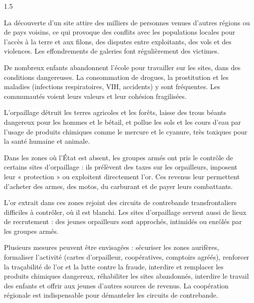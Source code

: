 \documentclass[12pt]{article}
\begin{document}
\begin{spacing}{1.5}


La découverte d'un site attire des milliers de personnes venues d'autres régions ou de pays voisins, ce qui provoque des conflits avec les populations locales pour l'accès à la terre et aux filons, des disputes entre exploitants, des vols et des violences. Les effondrements de galeries font régulièrement des victimes.

De nombreux enfants abandonnent l'école pour travailler sur les sites, dans des conditions dangereuses. La consommation de drogues, la prostitution et les maladies (infections respiratoires, VIH, accidents) y sont fréquentes. Les communautés voient leurs valeurs et leur cohésion fragilisées.

L'orpaillage détruit les terres agricoles et les forêts, laisse des trous béants dangereux pour les hommes et le bétail, et pollue les sols et les cours d'eau par l'usage de produits chimiques comme le mercure et le cyanure, très toxiques pour la santé humaine et animale.



Dans les zones où l'État est absent, les groupes armés ont pris le contrôle de certains sites d'orpaillage : ils prélèvent des taxes sur les orpailleurs, imposent leur « protection » ou exploitent directement l'or. Ces revenus leur permettent d'acheter des armes, des motos, du carburant et de payer leurs combattants.

L'or extrait dans ces zones rejoint des circuits de contrebande transfrontaliers difficiles à contrôler, où il est blanchi. Les sites d'orpaillage servent aussi de lieux de recrutement : des jeunes orpailleurs sont approchés, intimidés ou enrôlés par les groupes armés.

Plusieurs mesures peuvent être envisagées : sécuriser les zones aurifères, formaliser l'activité (cartes d'orpailleur, coopératives, comptoirs agréés), renforcer la traçabilité de l'or et la lutte contre la fraude, interdire et remplacer les produits chimiques dangereux, réhabiliter les sites abandonnés, interdire le travail des enfants et offrir aux jeunes d'autres sources de revenus. La coopération régionale est indispensable pour démanteler les circuits de contrebande.


\end{spacing}
\end{document}
